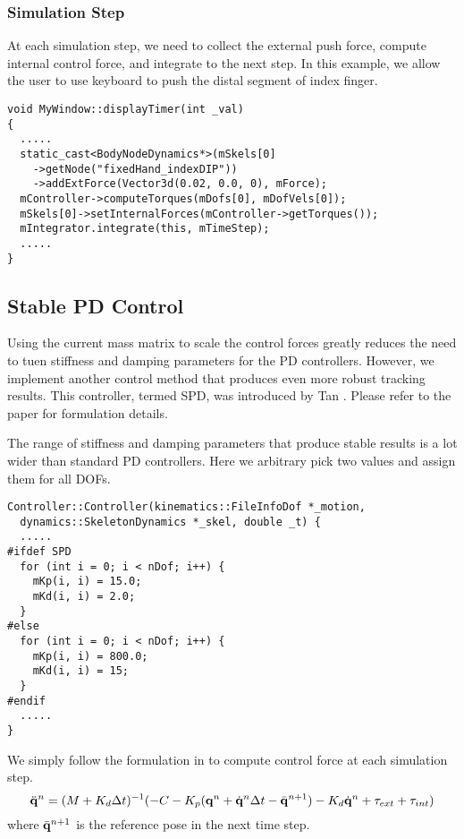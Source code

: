 \subsubsection{Simulation Step}
At each simulation step, we need to collect the external push force,
compute internal control force, and integrate to the next step. In
this example, we allow the user to use keyboard to push the distal
segment of index finger.

\ttfamily
\begin{lstlisting}[caption=MyWindow.cpp]
void MyWindow::displayTimer(int _val)
{
  .....
  static_cast<BodyNodeDynamics*>(mSkels[0]
    ->getNode("fixedHand_indexDIP"))
    ->addExtForce(Vector3d(0.02, 0.0, 0), mForce);
  mController->computeTorques(mDofs[0], mDofVels[0]);
  mSkels[0]->setInternalForces(mController->getTorques());
  mIntegrator.integrate(this, mTimeStep);
  .....
}
\end{lstlisting}
\rmfamily

\subsection{Stable PD Control}
Using the current mass matrix to scale the control forces greatly
reduces the need to tuen stiffness and damping parameters for the PD
controllers. However, we implement another control method that
produces even more robust tracking results. This controller, termed
SPD, was introduced by Tan \etal \cite{}. Please refer to the paper
for formulation details.

The range of stiffness and damping parameters that produce stable
results is a lot wider than standard PD controllers. Here we arbitrary
pick two values and assign them for all DOFs.

\ttfamily
\begin{lstlisting}[caption=Controller.cpp]
Controller::Controller(kinematics::FileInfoDof *_motion, 
  dynamics::SkeletonDynamics *_skel, double _t) {
  .....
#ifdef SPD
  for (int i = 0; i < nDof; i++) {
    mKp(i, i) = 15.0;
    mKd(i, i) = 2.0;
  }
#else
  for (int i = 0; i < nDof; i++) {
    mKp(i, i) = 800.0;
    mKd(i, i) = 15;
  }
#endif
  .....
}
\end{lstlisting}
\rmfamily

We simply follow the formulation in \cite{} to compute control force
at each simulation step. 
\begin{equation}
\ddot{\mathbf{q}}^n = (M + K_d \Delta t)^{-1} (-C - K_p(\mathbf{q}^n +
\dot{\mathbf{q}}^n \Delta t - \bar{\mathbf{q}}^{n+1}) - K_d \dot{\mathbf{q}}^n +
\tau_{ext} + \tau_{int})
\end{equation}
where $\bar{\mathbf{q}}^{n+1}$ is the reference pose in the next time step.

